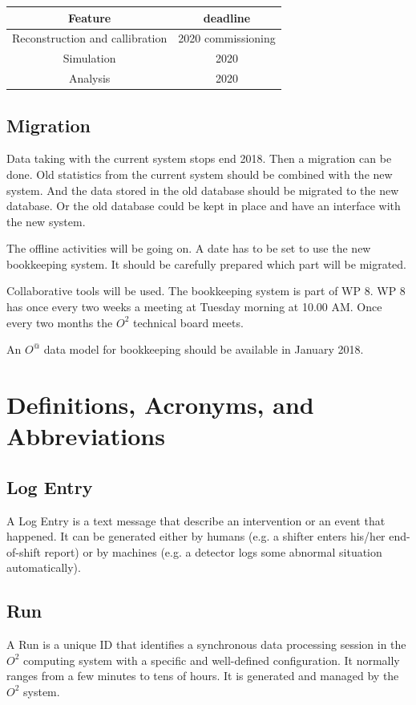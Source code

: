 \begin{tabular}{cc}
\hline
Feature & deadline\\
\hline
\hline
 Reconstruction and callibration  & 2020 commissioning \\
 \hline
Simulation   & 2020\\
\hline
Analysis & 2020\\
\hline
\end{tabular}

\subsection{Migration}
Data taking with the current system stops end 2018. Then a migration can be done. Old statistics from the current system should be combined with the new system. And the data stored in the old database should be migrated to the new database. Or the old database could be kept in place and have an interface with the new system. 

The offline activities will be going on. A date has to be set to use the new bookkeeping system. It should be carefully prepared which part will be migrated.

Collaborative tools will be used. The bookkeeping system is part of WP 8. WP 8 has once every two weeks a meeting at Tuesday morning at 10.00 AM. Once every two months the $O^2$ technical board meets. 

An $O^@$ data model for bookkeeping should be available in January 2018.



\section{Definitions, Acronyms, and Abbreviations}




\subsection{Log Entry}
A Log Entry is a text message that describe an intervention or an event that happened. It can be generated either by humans (e.g. a shifter enters his/her end-of-shift report) or by machines (e.g. a detector logs some abnormal situation automatically). 

\subsection{Run}
A Run is a unique ID that identifies a synchronous data processing session in the $O^2$ computing system with a specific and well-defined configuration. It normally ranges from a few minutes to tens of hours. It is generated and managed by the $O^2$ system. 

